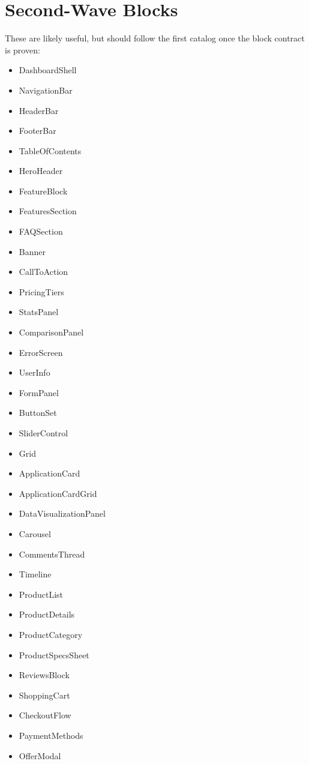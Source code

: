 \section{Second-Wave Blocks}\label{record-128-second-wave-blocks}

These are likely useful, but should follow the first catalog once the block contract is proven:

\begin{itemize}
\tightlist
\item
  DashboardShell
\item
  NavigationBar
\item
  HeaderBar
\item
  FooterBar
\item
  TableOfContents
\item
  HeroHeader
\item
  FeatureBlock
\item
  FeaturesSection
\item
  FAQSection
\item
  Banner
\item
  CallToAction
\item
  PricingTiers
\item
  StatsPanel
\item
  ComparisonPanel
\item
  ErrorScreen
\item
  UserInfo
\item
  FormPanel
\item
  ButtonSet
\item
  SliderControl
\item
  Grid
\item
  ApplicationCard
\item
  ApplicationCardGrid
\item
  DataVisualizationPanel
\item
  Carousel
\item
  CommentsThread
\item
  Timeline
\item
  ProductList
\item
  ProductDetails
\item
  ProductCategory
\item
  ProductSpecsSheet
\item
  ReviewsBlock
\item
  ShoppingCart
\item
  CheckoutFlow
\item
  PaymentMethods
\item
  OfferModal

\end{itemize}
